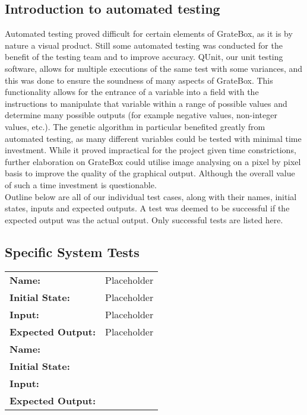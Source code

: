\documentclass[12pt, titlepage]{article}
\begin{document}
\subsection{Introduction to automated testing}

Automated testing proved difficult for certain elements of GrateBox, as it is 
by nature a visual product. Still some automated testing was conducted for the 
benefit of the testing team and to improve accuracy. QUnit, our unit testing 
software, allows for multiple executions of the same test with some variances, 
and this was done to ensure the soundness of many aspects of GrateBox. This 
functionality allows for the entrance of a variable into a field with the 
instructions to manipulate that variable within a range of possible values and 
determine many possible outputs (for example negative values, non-integer 
values, etc.). The genetic algorithm in particular benefited greatly from 
automated testing, as many different variables could be tested with minimal time 
investment. While it proved impractical for the project given time 
constrictions, further elaboration on GrateBox could utilise image analysing on 
a pixel by pixel basis to improve the quality of the graphical output. Although 
the overall value of such a time investment is questionable.\\

Outline below are all of our individual test cases, along with their names, initial states, inputs and expected outputs. A test was deemed to be successful if the expected output was the actual output. Only successful tests are listed here.

\subsection{Specific System Tests}


\begin{center}
\begin{longtable}{ l | p{10cm} }
\hline
\rule{0pt}{1.5em}\textbf{Name:} & Placeholder\\
\textbf{Initial State:} & Placeholder\\
\textbf{Input:} & Placeholder\\
\textbf{Expected Output:} & Placeholder\\[0.6em]
\hline
\rule{0pt}{1.5em}\textbf{Name:} & \\
\textbf{Initial State:} & \\
\textbf{Input:} & \\
\textbf{Expected Output:} & \\[0.6em]
\end{longtable}
\end{center}
\end{document}
